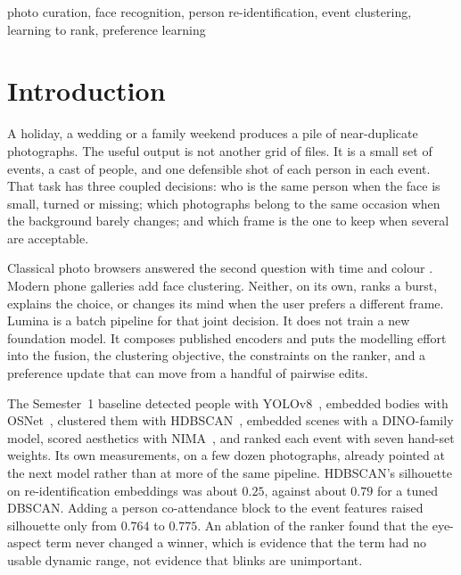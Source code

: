 \documentclass[conference]{IEEEtran}
\begin{document}
\begin{IEEEkeywords}
photo curation, face recognition, person re-identification, event clustering,
learning to rank, preference learning
\end{IEEEkeywords}

\section{Introduction}
\label{sec:intro}

A holiday, a wedding or a family weekend produces a pile of near-duplicate
photographs. The useful output is not another grid of files. It is a small set
of events, a cast of people, and one defensible shot of each person in each
event. That task has three coupled decisions: who is the same person when the
face is small, turned or missing; which photographs belong to the same
occasion when the background barely changes; and which frame is the one to
keep when several are acceptable.

Classical photo browsers answered the second question with time and colour
\cite{platt2003phototoc}. Modern phone galleries add face clustering. Neither,
on its own, ranks a burst, explains the choice, or changes its mind when the
user prefers a different frame. Lumina is a batch pipeline for that joint
decision. It does not train a new foundation model. It composes published
encoders and puts the modelling effort into the fusion, the clustering
objective, the constraints on the ranker, and a preference update that can
move from a handful of pairwise edits.

The Semester~1 baseline detected people with YOLOv8~\cite{jocher2023yolov8},
embedded bodies with OSNet~\cite{zhou2019osnet}, clustered them with
HDBSCAN~\cite{mcinnes2017hdbscan}, embedded scenes with a DINO-family
model, scored aesthetics with NIMA~\cite{talebi2018nima}, and ranked each
event with seven hand-set weights. Its own measurements, on a few dozen
photographs, already pointed at the next model rather than at more of the same
pipeline. HDBSCAN's silhouette on re-identification embeddings was about
$0.25$, against about $0.79$ for a tuned DBSCAN. Adding a person
co-attendance block to the event features raised silhouette only from $0.764$
to $0.775$. An ablation of the ranker found that the eye-aspect term never
changed a winner, which is evidence that the term had no usable dynamic range,
not evidence that blinks are unimportant.
\end{document}

